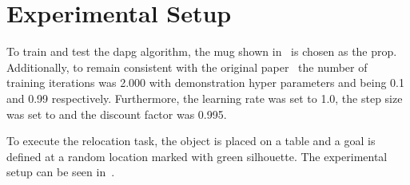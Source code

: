 \section{Experimental Setup}\label{sec:3-in-hand-manipulation-experimental-setup}

To train and test the \gls{dapg} algorithm, the mug shown in~ is chosen as the prop. Additionally, to remain consistent with the original paper~\cite{dexmv:-imitation-learning-for-dexterous-manipulation-from-human-videos} the number of training iterations was \num{2,000} with demonstration hyper parameters  and  being \num{0.1} and \num{0.99} respectively. Furthermore, the learning rate  was set to \num{1.0}, the step size \mvar{\delta} was set to  and the discount factor \mvar{\gamma} was \num{0.995}. \medskip

To execute the relocation task, the object is placed on a table and a goal is defined at a random location marked with green silhouette. The experimental setup can be seen in~.

